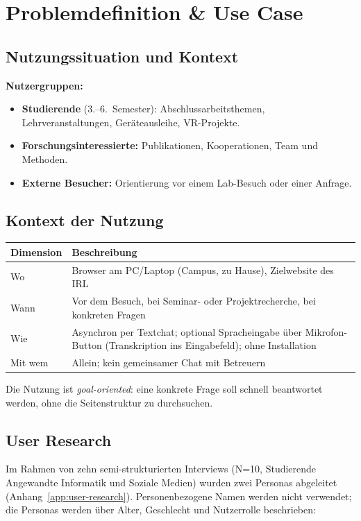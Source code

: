 \section{Problemdefinition \& Use Case}

\subsection{Nutzungssituation und Kontext}

\textbf{Nutzergruppen:}
\begin{itemize}
    \item \textbf{Studierende} (3.--6.~Semester): Abschlussarbeitsthemen, Lehrveranstaltungen, Geräteausleihe, VR-Projekte.
    \item \textbf{Forschungsinteressierte:} Publikationen, Kooperationen, Team und Methoden.
    \item \textbf{Externe Besucher:} Orientierung vor einem Lab-Besuch oder einer Anfrage.
\end{itemize}

\subsection{Kontext der Nutzung}

\begin{tabularx}{\textwidth}{@{}l X@{}}
\toprule
\textbf{Dimension} & \textbf{Beschreibung} \\
\midrule
Wo & Browser am PC/Laptop (Campus, zu Hause), Zielwebsite des IRL \\
Wann & Vor dem Besuch, bei Seminar- oder Projektrecherche, bei konkreten Fragen \\
Wie & Asynchron per Textchat; optional Spracheingabe über Mikrofon-Button (Transkription ins Eingabefeld); ohne Installation \\
Mit wem & Allein; kein gemeinsamer Chat mit Betreuern \\
\bottomrule
\end{tabularx}

Die Nutzung ist \textit{goal-oriented}: eine konkrete Frage soll schnell beantwortet werden, ohne die Seitenstruktur zu durchsuchen.

\subsection{User Research}

Im Rahmen von zehn semi-strukturierten Interviews (N=10, Studierende Angewandte Informatik und Soziale Medien) wurden zwei Personas abgeleitet (Anhang~\ref{app:user-research}). Personenbezogene Namen werden nicht verwendet; die Personas werden über Alter, Geschlecht und Nutzerrolle beschrieben:

